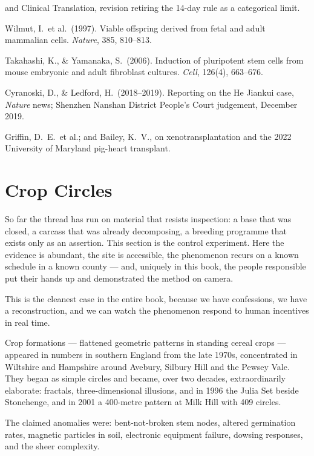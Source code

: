 \begin{srcnotes}
{and Clinical Translation}, revision retiring the 14-day rule as a categorical limit.
\item Wilmut, I.\ et al.\ (1997). Viable offspring derived from fetal and adult mammalian cells.
\emph{Nature}, 385, 810--813.
\item Takahashi, K., \& Yamanaka, S.\ (2006). Induction of pluripotent stem cells from mouse
embryonic and adult fibroblast cultures. \emph{Cell}, 126(4), 663--676.
\item Cyranoski, D., \& Ledford, H.\ (2018--2019). Reporting on the He Jiankui case, \emph{Nature}
news; Shenzhen Nanshan District People's Court judgement, December 2019.
\item Griffin, D.\ E.\ et al.; and Bailey, K.\ V., on xenotransplantation and the 2022 University of
Maryland pig-heart transplant.
\end{srcnotes}

\section{Crop Circles}\label{sec:cropcircles}

So far the thread has run on material that resists inspection: a base that was closed, a carcass
that was already decomposing, a breeding programme that exists only as an assertion. This section
is the control experiment. Here the evidence is abundant, the site is accessible, the phenomenon
recurs on a known schedule in a known county --- and, uniquely in this book, the people responsible
put their hands up and demonstrated the method on camera.

This is the cleanest case in the entire book, because we have confessions, we have a
reconstruction, and we can watch the phenomenon respond to human incentives in real time.

Crop formations --- flattened geometric patterns in standing cereal crops --- appeared in numbers
in southern England from the late 1970s, concentrated in Wiltshire and Hampshire around
Avebury, Silbury Hill and the Pewsey Vale. They began as simple circles and became, over two
decades, extraordinarily elaborate: fractals, three-dimensional illusions, and in 1996 the
Julia Set beside Stonehenge, and in 2001 a 400-metre pattern at Milk Hill with 409 circles.

The claimed anomalies were: bent-not-broken stem nodes, altered germination rates, magnetic
particles in soil, electronic equipment failure, dowsing responses, and the sheer complexity.

